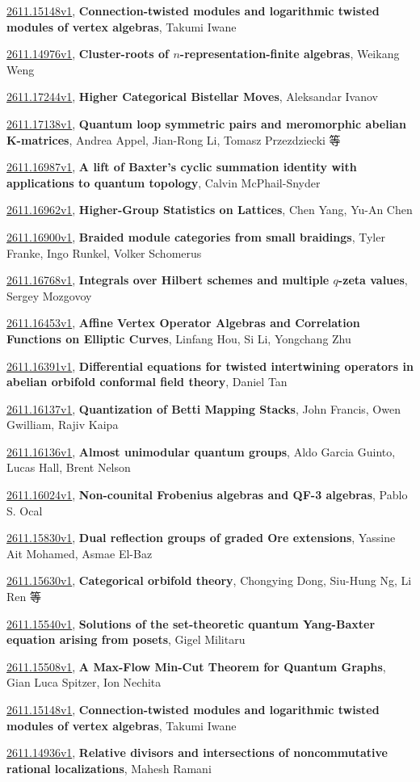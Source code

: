 \documentclass[9pt, a4paper]{article}
\theoremstyle{plain}
\theoremstyle{definition}
\theoremstyle{remark}
\newcommand{\arxiv}[3]{\href{https://arxiv.org/abs/#1}{#1}, \textbf{\textcolor{arxivblue}{#2}}, #3}
\begin{document}
\arxiv{2611.15148v1}{Connection-twisted modules and logarithmic twisted modules of vertex algebras}{Takumi Iwane}

\arxiv{2611.14976v1}{Cluster-roots of $n$-representation-finite algebras}{Weikang Weng}

\arxiv{2611.17244v1}{Higher Categorical Bistellar Moves}{Aleksandar Ivanov}

\arxiv{2611.17138v1}{Quantum loop symmetric pairs and meromorphic abelian K-matrices}{Andrea Appel, Jian-Rong Li, Tomasz Przezdziecki 等}

\arxiv{2611.16987v1}{A lift of Baxter's cyclic summation identity with applications to quantum topology}{Calvin McPhail-Snyder}

\arxiv{2611.16962v1}{Higher-Group Statistics on Lattices}{Chen Yang, Yu-An Chen}

\arxiv{2611.16900v1}{Braided module categories from small braidings}{Tyler Franke, Ingo Runkel, Volker Schomerus}

\arxiv{2611.16768v1}{Integrals over Hilbert schemes and multiple $q$-zeta values}{Sergey Mozgovoy}

\arxiv{2611.16453v1}{Affine Vertex Operator Algebras and Correlation Functions on Elliptic Curves}{Linfang Hou, Si Li, Yongchang Zhu}

\arxiv{2611.16391v1}{Differential equations for twisted intertwining operators in abelian orbifold conformal field theory}{Daniel Tan}

\arxiv{2611.16137v1}{Quantization of Betti Mapping Stacks}{John Francis, Owen Gwilliam, Rajiv Kaipa}

\arxiv{2611.16136v1}{Almost unimodular quantum groups}{Aldo Garcia Guinto, Lucas Hall, Brent Nelson}

\arxiv{2611.16024v1}{Non-counital Frobenius algebras and QF-3 algebras}{Pablo S. Ocal}

\arxiv{2611.15830v1}{Dual reflection groups of graded Ore extensions}{Yassine Ait Mohamed, Asmae El-Baz}

\arxiv{2611.15630v1}{Categorical orbifold theory}{Chongying Dong, Siu-Hung Ng, Li Ren 等}

\arxiv{2611.15540v1}{Solutions of the set-theoretic quantum Yang-Baxter equation arising from posets}{Gigel Militaru}

\arxiv{2611.15508v1}{A Max-Flow Min-Cut Theorem for Quantum Graphs}{Gian Luca Spitzer, Ion Nechita}

\arxiv{2611.15148v1}{Connection-twisted modules and logarithmic twisted modules of vertex algebras}{Takumi Iwane}

\arxiv{2611.14936v1}{Relative divisors and intersections of noncommutative rational localizations}{Mahesh Ramani}

\end{document}
